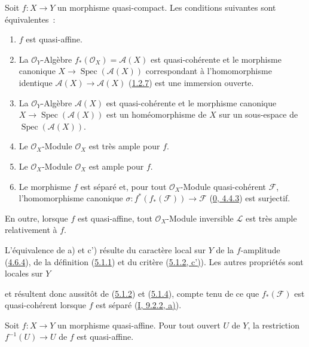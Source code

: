 \begin{proposition}[5.1.6]
\label{II.5.1.6-fr}
Soit $f:X\to Y$ un morphisme quasi-compact. Les conditions suivantes sont
équivalentes~:
\begin{enumerate}
  \item[\rm{a)}] $f$ est quasi-affine.
  \item[\rm{b)}] La $\mathcal{O}_Y$-Algèbre
  $f_*(\mathcal{O}_X)=\mathcal{A}(X)$ est quasi-cohérente et le morphisme
  canonique $X\to\operatorname{Spec}(\mathcal{A}(X))$ correspondant à
  l'homomorphisme identique $\mathcal{A}(X)\to\mathcal{A}(X)$
  (\hyperref[II.1.2.7-fr]{1.2.7}) est une immersion ouverte.
  \item[\rm{b')}] La $\mathcal{O}_Y$-Algèbre $\mathcal{A}(X)$ est
  quasi-cohérente et le morphisme canonique
  $X\to\operatorname{Spec}(\mathcal{A}(X))$ est un homéomorphisme de $X$
  sur un sous-espace de $\operatorname{Spec}(\mathcal{A}(X))$.
  \item[\rm{c)}] Le $\mathcal{O}_X$-Module $\mathcal{O}_X$ est très ample
  pour $f$.
  \item[\rm{c')}] Le $\mathcal{O}_X$-Module $\mathcal{O}_X$ est ample pour
  $f$.
  \item[\rm{d)}] Le morphisme $f$ est séparé et, pour tout
  $\mathcal{O}_X$-Module quasi-cohérent $\mathcal{F}$, l'homomorphisme
  canonique $\sigma:f^*(f_*(\mathcal{F}))\to\mathcal{F}$
  (\hyperref[0.4.4.3-fr]{0, 4.4.3}) est surjectif.
\end{enumerate}
En outre, lorsque $f$ est quasi-affine, tout $\mathcal{O}_X$-Module
inversible $\mathcal{L}$ est très ample relativement à $f$.
\end{proposition}

L'équivalence de a) et c') résulte du caractère local sur $Y$ de la
$f$-amplitude (\hyperref[II.4.6.4-fr]{4.6.4}), de la définition
(\hyperref[II.5.1.1-fr]{5.1.1}) et du critère
(\hyperref[II.5.1.2-fr]{5.1.2, c')}). Les autres propriétés sont locales sur
$Y$


et résultent donc aussitôt de (\hyperref[II.5.1.2-fr]{5.1.2}) et
(\hyperref[II.5.1.4-fr]{5.1.4}), compte tenu de ce que
$f_*(\mathcal{F})$ est quasi-cohérent lorsque $f$ est séparé
(\hyperref[I.9.2.2-fr]{I, 9.2.2, a)}).

\begin{corollary}[5.1.7]
\label{II.5.1.7-fr}
Soit $f:X\to Y$ un morphisme quasi-affine. Pour tout ouvert $U$ de $Y$, la
restriction $f^{-1}(U)\to U$ de $f$ est quasi-affine.
\end{corollary}

